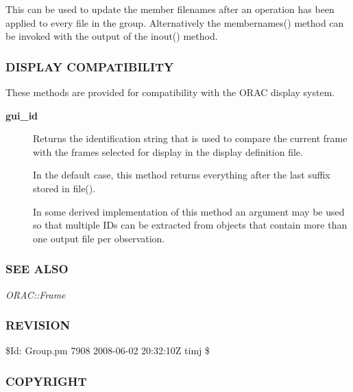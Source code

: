\begin{description}
\begin{description}
This can be used to update the member filenames after an operation
has been applied to every file in the group. Alternatively the
membernames() method can be invoked with the output of the inout()
method.

\end{description}
\subsubsection*{DISPLAY COMPATIBILITY\label{ORAC::Group_DISPLAY_COMPATIBILITY}}


These methods are provided for compatibility with the ORAC display
system.

\begin{description}

\item[{\textbf{gui\_id}}] \mbox{}

Returns the identification string that is used to compare the
current frame with the frames selected for display in the
display definition file.



In the default case, this method returns everything after the
last suffix stored in file().



In some derived implementation of this method an argument
may be used so that multiple IDs can be extracted from objects
that contain more than one output file per observation.

\end{description}
\subsubsection*{SEE ALSO\label{ORAC::Group_SEE_ALSO}}


\emph{ORAC::Frame}

\subsubsection*{REVISION\label{ORAC::Group_REVISION}}


\$Id: Group.pm 7908 2008-06-02 20:32:10Z timj \$

\subsubsection*{COPYRIGHT\label{ORAC::Group_COPYRIGHT}}



\end{description}
